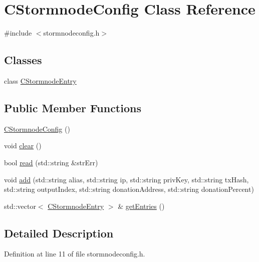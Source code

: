 \hypertarget{class_c_stormnode_config}{}\section{C\+Stormnode\+Config Class Reference}
\label{class_c_stormnode_config}


{\ttfamily \#include $<$stormnodeconfig.\+h$>$}

\subsection*{Classes}
\begin{DoxyCompactItemize}
\item 
class \hyperlink{class_c_stormnode_config_1_1_c_stormnode_entry}{C\+Stormnode\+Entry}
\end{DoxyCompactItemize}
\subsection*{Public Member Functions}
\begin{DoxyCompactItemize}
\item 
\hyperlink{class_c_stormnode_config_a5d9d5f0a4341f71b836b963e4f33bc24}{C\+Stormnode\+Config} ()
\item 
void \hyperlink{class_c_stormnode_config_a34f2decb80e1f0cc75bcc9f6a1188a74}{clear} ()
\item 
bool \hyperlink{class_c_stormnode_config_a6ad22bf283a95ac600d0e1d37fa41d54}{read} (std\+::string \&str\+Err)
\item 
void \hyperlink{class_c_stormnode_config_a8713f692c251685c7ed7f29e9c5a4108}{add} (std\+::string alias, std\+::string ip, std\+::string priv\+Key, std\+::string tx\+Hash, std\+::string output\+Index, std\+::string donation\+Address, std\+::string donation\+Percent)
\item 
std\+::vector$<$ \hyperlink{class_c_stormnode_config_1_1_c_stormnode_entry}{C\+Stormnode\+Entry} $>$ \& \hyperlink{class_c_stormnode_config_aadf8ea91de17d416d1046987f07c4d1a}{get\+Entries} ()
\end{DoxyCompactItemize}


\subsection{Detailed Description}


Definition at line 11 of file stormnodeconfig.\+h.




